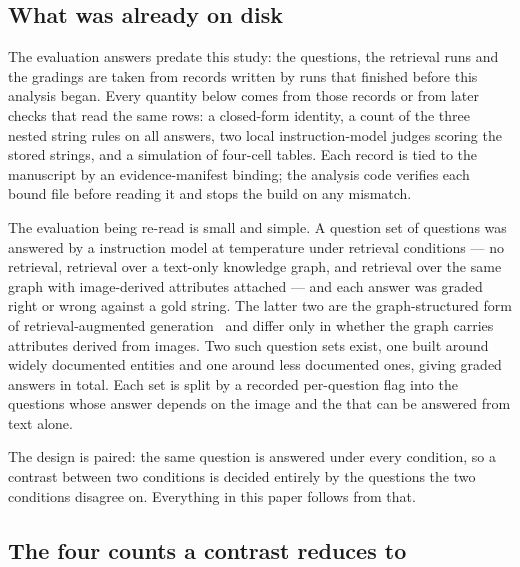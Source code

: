 
\subsection{What was already on disk}

The evaluation answers predate this study: the questions, the retrieval runs
and the gradings are taken from records written by runs that finished before
this analysis began. Every quantity below comes from those records or from
later checks that read the same rows: a closed-form identity, a count of the
three nested string rules on all \Answers{} answers, two local
instruction-model judges scoring the stored strings, and a simulation of
four-cell tables. Each record is tied to the manuscript by an
evidence-manifest binding; the analysis code verifies each bound file before
reading it and stops the build on any mismatch.

The evaluation being re-read is small and simple. A question set of
\Questions{} questions was answered by a \Model{} instruction model at
temperature \Temperature{} under \ConditionsWord{} retrieval conditions --- no
retrieval, retrieval over a text-only knowledge graph, and retrieval over the
same graph with image-derived attributes attached --- and each answer was
graded right or wrong against a gold string. The latter two are the
graph-structured form of retrieval-augmented
generation~\cite{lewis2020retrieval,karpukhin2020dpr,guu2020realm,
izacard2021fid,izacard2022atlas,edge2024local} and differ only in whether
the graph carries attributes derived from images. Two such question sets exist, one
built around widely documented entities and one around less documented ones,
giving \Answers{} graded answers in total. Each set is split by a recorded
per-question flag into the \SubsetN{} questions whose answer depends on the
image and the \TextOnlyN{} that can be answered from text alone.

The design is paired: the same question is answered under every condition, so a
contrast between two conditions is decided entirely by the questions the two
conditions disagree on. Everything in this paper follows from that.

\subsection{The four counts a contrast reduces to}

